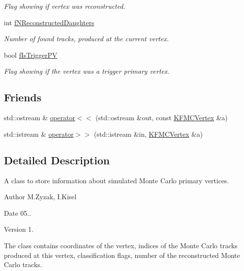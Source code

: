 \begin{DoxyCompactItemize}
\begin{DoxyCompactList}\small\item\em Flag showing if vertex was reconstructed. \end{DoxyCompactList}\item 
int \hyperlink{classKFMCVertex_add1221f3483673f4641934d4933f5cd4}{f\+N\+Reconstructed\+Daughters}\hypertarget{classKFMCVertex_add1221f3483673f4641934d4933f5cd4}{}\label{classKFMCVertex_add1221f3483673f4641934d4933f5cd4}

\begin{DoxyCompactList}\small\item\em Number of found tracks, produced at the current vertex. \end{DoxyCompactList}\item 
bool \hyperlink{classKFMCVertex_a9e37d86942db0797e198ef4e61ab1867}{f\+Is\+Trigger\+PV}\hypertarget{classKFMCVertex_a9e37d86942db0797e198ef4e61ab1867}{}\label{classKFMCVertex_a9e37d86942db0797e198ef4e61ab1867}

\begin{DoxyCompactList}\small\item\em Flag showing if the vertex was a trigger primary vertex. \end{DoxyCompactList}\end{DoxyCompactItemize}
\subsection*{Friends}
\begin{DoxyCompactItemize}
\item 
std\+::ostream \& \hyperlink{classKFMCVertex_af066fb42a2f04f8027e74113d5940dae}{operator$<$$<$} (std\+::ostream \&out, const \hyperlink{classKFMCVertex}{K\+F\+M\+C\+Vertex} \&a)
\item 
std\+::istream \& \hyperlink{classKFMCVertex_a07f15138b33749b902ae133f7ec69cb0}{operator$>$$>$} (std\+::istream \&in, \hyperlink{classKFMCVertex}{K\+F\+M\+C\+Vertex} \&a)
\end{DoxyCompactItemize}


\subsection{Detailed Description}
A class to store information about simulated Monte Carlo primary vertices. 

\begin{DoxyAuthor}{Author}
M.\+Zyzak, I.\+Kisel 
\end{DoxyAuthor}
\begin{DoxyDate}{Date}
05.. 
\end{DoxyDate}
\begin{DoxyVersion}{Version}
1.
\end{DoxyVersion}
The class contains coordinates of the vertex, indices of the Monte Carlo tracks produced at this vertex, classification flags, number of the reconstructed Monte Carlo tracks. 

